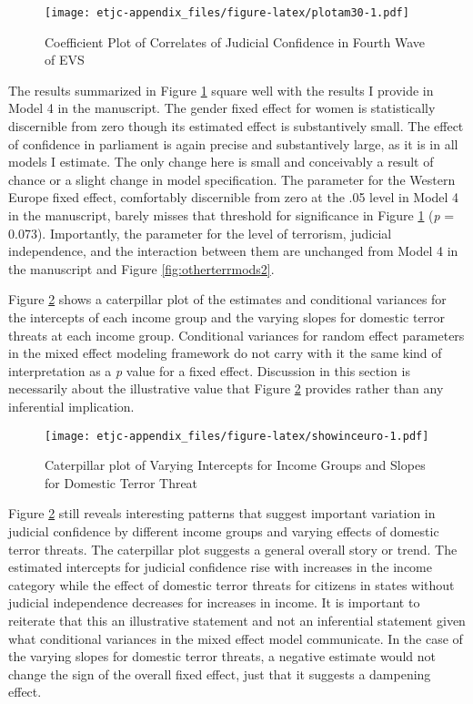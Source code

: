 \documentclass[11pt,]{article}
\makeatletter
\def\maxwidth{\ifdim\Gin@nat@width>\linewidth\linewidth
\else\Gin@nat@width\fi}
\let\Oldincludegraphics\includegraphics
\renewcommand{\includegraphics}[1]{\Oldincludegraphics[width=\maxwidth]{#1}}
\makeatother
\begin{document}
\begin{figure}[htbp]
\centering
\texttt{[image: etjc-appendix\_files/figure-latex/plotam30-1.pdf]}
\caption{\label{fig:plotam30} Coefficient Plot of Correlates of Judicial
Confidence in Fourth Wave of EVS}
\end{figure}

The results summarized in Figure \ref{fig:plotam30} square well with the
results I provide in Model 4 in the manuscript. The gender fixed effect
for women is statistically discernible from zero though its estimated
effect is substantively small. The effect of confidence in parliament is
again precise and substantively large, as it is in all models I
estimate. The only change here is small and conceivably a result of
chance or a slight change in model specification. The parameter for the
Western Europe fixed effect, comfortably discernible from zero at the
.05 level in Model 4 in the manuscript, barely misses that threshold for
significance in Figure \ref{fig:plotam30} (\emph{p} = 0.073).
Importantly, the parameter for the level of terrorism, judicial
independence, and the interaction between them are unchanged from Model
4 in the manuscript and Figure \ref{fig:otherterrmods2}.

Figure \ref{fig:showinceuro} shows a caterpillar plot of the estimates
and conditional variances for the intercepts of each income group and
the varying slopes for domestic terror threats at each income group.
Conditional variances for random effect parameters in the mixed effect
modeling framework do not carry with it the same kind of interpretation
as a \emph{p} value for a fixed effect. Discussion in this section is
necessarily about the illustrative value that Figure
\ref{fig:showinceuro} provides rather than any inferential implication.

\begin{figure}[htbp]
\centering
\texttt{[image: etjc-appendix\_files/figure-latex/showinceuro-1.pdf]}
\caption{\label{fig:showinceuro} Caterpillar plot of Varying Intercepts
for Income Groups and Slopes for Domestic Terror Threat}
\end{figure}

Figure \ref{fig:showinceuro} still reveals interesting patterns that
suggest important variation in judicial confidence by different income
groups and varying effects of domestic terror threats. The caterpillar
plot suggests a general overall story or trend. The estimated intercepts
for judicial confidence rise with increases in the income category while
the effect of domestic terror threats for citizens in states without
judicial independence decreases for increases in income. It is important
to reiterate that this an illustrative statement and not an inferential
statement given what conditional variances in the mixed effect model
communicate. In the case of the varying slopes for domestic terror
threats, a negative estimate would not change the sign of the overall
fixed effect, just that it suggests a dampening effect.
\end{document}
